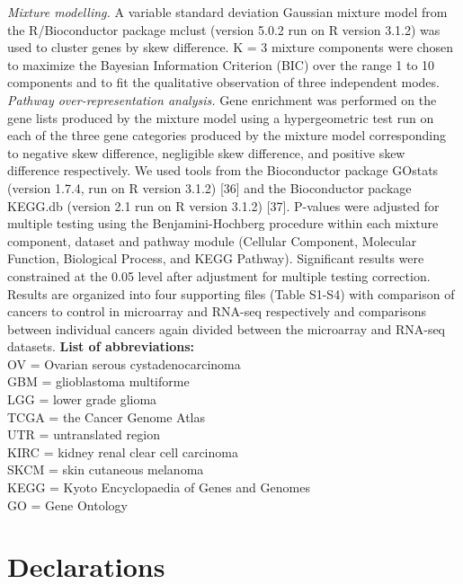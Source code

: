 \documentclass[11pt]{article}
\begin{document}
\newline
\newline
\textit{Mixture modelling.} A variable standard deviation Gaussian mixture model from the R/Bioconductor package mclust (version 5.0.2 run on R version 3.1.2) was used to cluster genes by skew difference. K = 3 mixture components were chosen to maximize the Bayesian Information Criterion (BIC) over the range 1 to 10 components and to fit the qualitative observation of three independent modes.
\newline
\newline
\textit{Pathway over-representation analysis.} Gene enrichment was performed on the gene lists produced by the mixture model using a hypergeometric test run on each of the three gene categories produced by the mixture model corresponding to negative skew difference, negligible skew difference, and positive skew difference respectively. We used tools from the Bioconductor package GOstats (version 1.7.4, run on R version 3.1.2) [36] and the Bioconductor package KEGG.db (version 2.1 run on R version 3.1.2) [37]. P-values were adjusted for multiple testing using the Benjamini-Hochberg procedure within each mixture component, dataset and pathway module (Cellular Component, Molecular Function, Biological Process, and KEGG Pathway). Significant results were constrained at the 0.05 level after adjustment for multiple testing correction. Results are organized into four supporting files (Table S1-S4) with comparison of cancers to control in microarray and RNA-seq respectively and comparisons between individual cancers again divided between the microarray and RNA-seq datasets.
\newline
\newline
\textbf{List of abbreviations:} \\
OV = Ovarian serous cystadenocarcinoma \\
GBM = glioblastoma multiforme \\
LGG = lower grade glioma \\
TCGA = the Cancer Genome Atlas  \\
UTR = untranslated region \\
KIRC = kidney renal clear cell carcinoma \\
SKCM = skin cutaneous melanoma \\
KEGG = Kyoto Encyclopaedia of Genes and Genomes \\
GO = Gene Ontology

\section*{Declarations}
\end{document}

